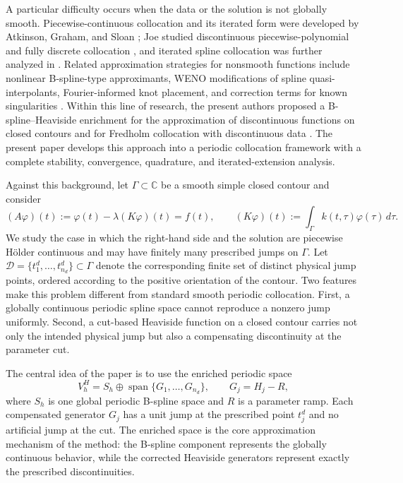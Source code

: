 \documentclass[11pt,a4paper]{amsart}
\theoremstyle{plain}
\theoremstyle{definition}
\theoremstyle{remark}
\newcommand{\Ga}{\Gamma}
\newcommand{\D}{\mathcal D}
\newcommand{\C}{\mathbb C}
\newcommand{\spanop}{\operatorname{span}}
\begin{document}
A particular difficulty occurs when the data or the solution is not globally smooth.  Piecewise-continuous collocation and its iterated form were developed by Atkinson, Graham, and Sloan \cite{AtkinsonGrahamSloan}; Joe studied discontinuous piecewise-polynomial and fully discrete collocation \cite{Joe1985,JoeDiscrete1985}, and iterated spline collocation was further analyzed in \cite{GrahamJoeSloan1985}.  Related approximation strategies for nonsmooth functions include nonlinear B-spline-type approximants, WENO modifications of spline quasi-interpolants, Fourier-informed knot placement, and correction terms for known singularities \cite{Amat2023,Arandiga2023,Lenz2023,LiPanRuizYanez2024}.  Within this line of research, the present authors proposed a B-spline--Heaviside enrichment for the approximation of discontinuous functions on closed contours and for Fredholm collocation with discontinuous data \cite{CapceleaCapcelea2022,CapceleaCapcelea2023}.  The present paper develops this approach into a periodic collocation framework with a complete stability, convergence, quadrature, and iterated-extension analysis.

Against this background, let $\Ga\subset\C$ be a smooth simple closed contour and consider
\begin{equation}\label{eq:main}
        (A\varphi)(t)
        :=\varphi(t)-\lambda(K\varphi)(t)=f(t),
        \qquad
        (K\varphi)(t):=\int_\Ga k(t,\tau)\varphi(\tau)\,d\tau.
\end{equation}
We study the case in which the right-hand side and the solution are piecewise H\"older continuous and may have finitely many prescribed jumps on $\Ga$.  Let
$
        \D=\{t_1^d,\ldots,t_{n_d}^d\}\subset\Ga
$
denote the corresponding finite set of distinct physical jump points, ordered according to the positive orientation of the contour.  Two features make this problem different from standard smooth periodic collocation.  First, a globally continuous periodic spline space cannot reproduce a nonzero jump uniformly.  Second, a cut-based Heaviside function on a closed contour carries not only the intended physical jump but also a compensating discontinuity at the parameter cut.

The central idea of the paper is to use the enriched periodic space
\[
        V_h^H
        =
        S_h\oplus
        \spanop\{G_1,\ldots,G_{n_d}\},
        \qquad
        G_j=H_j-R,
\]
where $S_h$ is one global periodic B-spline space and $R$ is a parameter ramp.  Each compensated generator $G_j$ has a unit jump at the prescribed point $t_j^d$ and no artificial jump at the cut.  The enriched space is the core approximation mechanism of the method: the B-spline component represents the globally continuous behavior, while the corrected Heaviside generators represent exactly the prescribed discontinuities.
\end{document}
